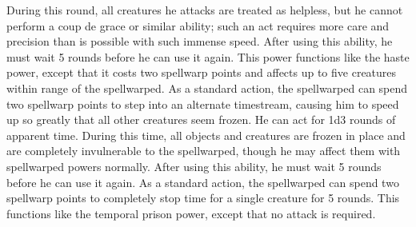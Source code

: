 During this round, all creatures he attacks are treated as helpless, but he cannot perform a coup de grace or similar ability; such an act requires more care and precision than is possible with such immense speed.
After using this ability, he must wait 5 rounds before he can use it again.
This power functions like the haste power, except that it costs two spellwarp points and affects up to five creatures within \rngclose range of the spellwarped.
As a standard action, the spellwarped can spend two spellwarp points to step into an alternate timestream, causing him to speed up so greatly that all other creatures seem frozen.
He can act for 1d3 rounds of apparent time.
During this time, all objects and creatures are frozen in place and are completely invulnerable to the spellwarped, though he may affect them with spellwarped powers normally.
After using this ability, he must wait 5 rounds before he can use it again.
As a standard action, the spellwarped can spend two spellwarp points to completely stop time for a single creature for 5 rounds.
This functions like the temporal prison power, except that no attack is required.
\norepeatnotes


